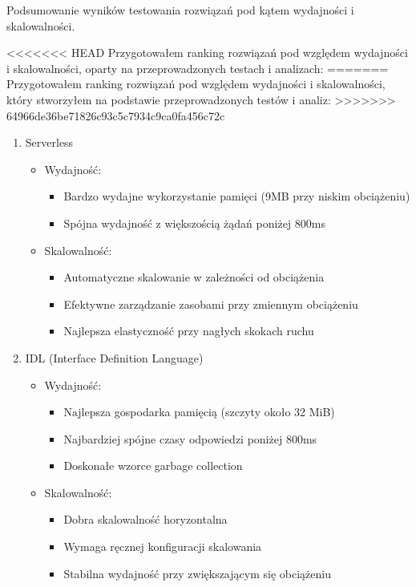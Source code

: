 \documentclass[runningheads,12pt]{llncs}
\begin{document}
\newpage


Podsumowanie wyników testowania rozwiązań pod kątem wydajności i skalowalności.

<<<<<<< HEAD
Przygotowałem ranking rozwiązań pod względem wydajności i skalowalności, oparty na przeprowadzonych testach i analizach:
=======
Przygotowałem ranking rozwiązań pod względem wydajności i skalowalności, który stworzyłem na podstawie przeprowadzonych testów i analiz:
>>>>>>> 64966de36be71826c93c5c7934c9ca0fa456c72c

\begin{enumerate}
    \item Serverless
    \begin{itemize}
        \item Wydajność:
        \begin{itemize}
            \item Bardzo wydajne wykorzystanie pamięci (9MB przy niskim obciążeniu)
            \item Spójna wydajność z większością żądań poniżej 800ms
        \end{itemize}
        \item Skalowalność:
        \begin{itemize}
            \item Automatyczne skalowanie w zależności od obciążenia
            \item Efektywne zarządzanie zasobami przy zmiennym obciążeniu
            \item Najlepsza elastyczność przy nagłych skokach ruchu
        \end{itemize}
    \end{itemize}

    \item IDL (Interface Definition Language)
    \begin{itemize}
        \item Wydajność:
        \begin{itemize}
            \item Najlepsza gospodarka pamięcią (szczyty około 32 MiB)
            \item Najbardziej spójne czasy odpowiedzi poniżej 800ms
            \item Doskonałe wzorce garbage collection
        \end{itemize}
        \item Skalowalność:
        \begin{itemize}
            \item Dobra skalowalność horyzontalna
            \item Wymaga ręcznej konfiguracji skalowania
            \item Stabilna wydajność przy zwiększającym się obciążeniu
        \end{itemize}
    \end{itemize}


\end{enumerate}
\end{document}
